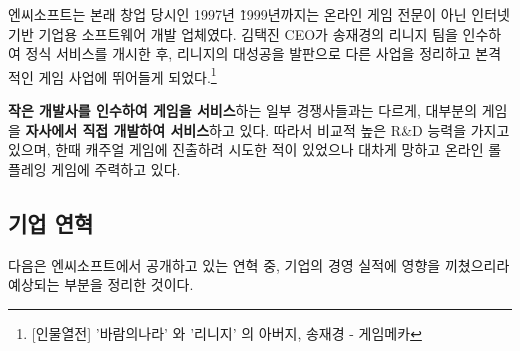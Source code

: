 \documentclass[11pt]{oblivoir}
\begin{document}
		엔씨소프트는 본래 창업 당시인 1997년 \~ 1999년까지는 온라인 게임 전문이 아닌 인터넷 기반 기업용 소프트웨어 개발 업체였다. 김택진 CEO가 송재경의 리니지 팀을 인수하여 정식 서비스를 개시한 후, 리니지의 대성공을 발판으로 다른 사업을 정리하고 본격적인 게임 사업에 뛰어들게 되었다.\footnote{[인물열전] '바람의나라' 와 '리니지' 의 아버지, 송재경 - 게임메카}
		
		\textbf{작은 개발사를 인수하여 게임을 서비스}하는 일부 경쟁사들과는 다르게, 대부분의 게임을 \textbf{자사에서 직접 개발하여 서비스}하고 있다. 따라서 비교적 높은 R\&D 능력을 가지고 있으며, 한때 캐주얼 게임에 진출하려 시도한 적이 있었으나 대차게 망하고 온라인 롤플레잉 게임에 주력하고 있다.
		
		\subsection{기업 연혁}
		다음은 엔씨소프트에서 공개하고 있는 연혁 중, 기업의 경영 실적에 영향을 끼쳤으리라 예상되는 부분을 정리한 것이다.
		
\end{document}
